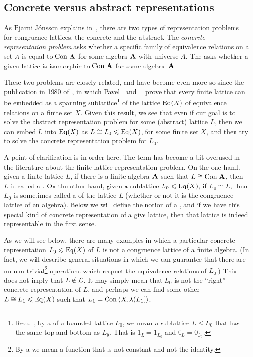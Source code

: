 \subsection{Concrete versus abstract representations}
As Bjarni J\'onsson explains in~\cite{Jonsson:1972}, there are two types of
representation problems for congruence lattices, the concrete and the
abstract.  The \emph{concrete representation problem} asks whether a specific family of
equivalence relations on a set $A$ is equal to $\operatorname{Con\,} \mathbf{A}$ for some
algebra $\mathbf{A}$ with universe $A$.  The 
asks whether a given lattice is isomorphic to $\operatorname{Con\,} \mathbf{A}$ for some algebra~$\mathbf{A}$.

These two problems are closely related, and have become even more so since the
publication in 1980 
of~\cite{Pudlak:1980}, in which Pavel \Pudlak\ and
\Jiri\ \Tuma\ prove that every finite
lattice can be embedded as a 
spanning sublattice\footnote{Recall, by a 
  of a bounded lattice $L_0$, we mean a sublattice $L\leq L_0$ that has the same top and
  bottom as $L_0$.  That is  $1_L = 1_{L_0}$ and $0_L = 0_{L_0}$.}
of the lattice $\operatorname{Eq}(X)$ of equivalence relations on a finite set $X$.   
Given this result, we see that even if our goal is to solve the abstract
representation problem for some (abstract) lattice $L$, then
we can embed $L$ into $\operatorname{Eq}(X)$ as $L\cong L_0\leqslant \operatorname{Eq}(X)$, for some finite set
$X$, and then try to solve the concrete representation problem for $L_0$.  

A point of clarification is in order here.  The term 
has become a bit overused in the literature about the finite lattice
representation problem.  On the one hand, given a finite lattice $L$, if there
is a finite algebra $\mathbf{A}$ such that $L \cong \operatorname{Con\,} \mathbf{A}$, then $L$ is called a
.  On the other hand, given a sublattice $L_0\leqslant \operatorname{Eq}(X)$, 
if $L_0\cong L$, then $L_0$ is sometimes called a 
of the lattice $L$ (whether or not it is the congruence lattice of an algebra).    
Below we will define the notion of a , and if we
have this special kind of concrete representation of a give lattice, then that
lattice is indeed representable in the first sense.

As we will see below, there are many examples in which a particular concrete
representation $L_0\leqslant \operatorname{Eq}(X)$ of $L$ is not a congruence lattice of a
finite algebra.  (In fact, we will describe general situations in which we can
guarantee that there are no non-trivial\footnote{By a 
   we mean a function that is
  not constant and not the identity.} operations which respect the equivalence
relations of $L_0$.)  This does not imply that $L \notin \mathcal{L}$.  It may
simply mean that $L_0$ is not the ``right'' concrete representation of $L$, and
perhaps we can find some other $L \cong L_1\leqslant \operatorname{Eq}(X)$ such that $L_1 = \operatorname{Con\,}
\langle X, \lambda(L_1)\rangle$.

